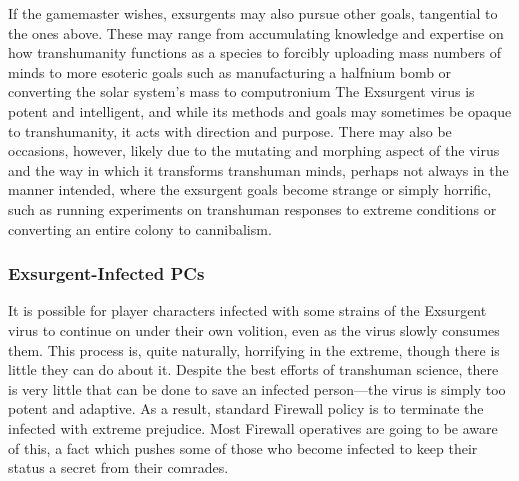 If the gamemaster wishes, exsurgents may also 
pursue other goals, tangential to the ones above. 
These may range from accumulating knowledge and 
expertise on how transhumanity functions as a species
to forcibly uploading mass numbers of minds to
more esoteric goals such as manufacturing a halfnium 
bomb or converting the solar system's mass to computronium
The Exsurgent virus is potent and intelligent,
and while its methods and goals may sometimes be 
opaque to transhumanity, it acts with direction and 
purpose. There may also be occasions, however, likely 
due to the mutating and morphing aspect of the virus 
and the way in which it transforms transhuman 
minds, perhaps not always in the manner intended, 
where the exsurgent goals become strange or simply 
horrific, such as running experiments on transhuman 
responses to extreme conditions or converting an 
entire colony to cannibalism.

\subsubsection{Exsurgent-Infected PCs}

It is possible for player characters infected with some 
strains of the Exsurgent virus to continue on under 
their own volition, even as the virus slowly consumes 
them. This process is, quite naturally, horrifying in the 
extreme, though there is little they can do about it. 
Despite the best efforts of transhuman science, there 
is very little that can be done to save an infected 
person—the virus is simply too potent and adaptive. 
As a result, standard Firewall policy is to terminate 
the infected with extreme prejudice. Most Firewall 
operatives are going to be aware of this, a fact which 
pushes some of those who become infected to keep 
their status a secret from their comrades.

